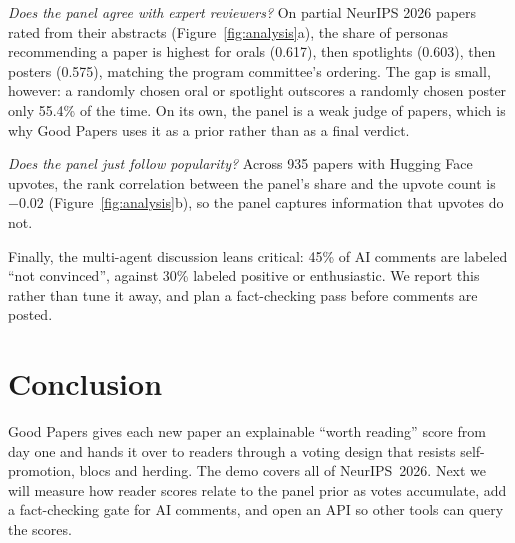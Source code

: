 \documentclass[sigconf]{acmart}
\newcommand{\sys}{Good Papers}
\begin{document}
\emph{Does the panel agree with expert reviewers?}
On partial NeurIPS 2026 papers rated from their abstracts (Figure~\ref{fig:analysis}a), the share of personas recommending a paper is highest for orals (0.617), then spotlights (0.603), then posters (0.575), matching the program committee's ordering.
The gap is small, however: a randomly chosen oral or spotlight outscores a randomly chosen poster only 55.4\% of the time.
On its own, the panel is a weak judge of papers, which is why \sys{} uses it as a prior rather than as a final verdict.

\emph{Does the panel just follow popularity?}
Across 935 papers with Hugging Face upvotes, the rank correlation between the panel's share and the upvote count is $-0.02$ (Figure~\ref{fig:analysis}b), so the panel captures information that upvotes do not.

Finally, the multi-agent discussion leans critical: 45\% of AI comments are labeled ``not convinced'', against 30\% labeled positive or enthusiastic.
We report this rather than tune it away, and plan a fact-checking pass before comments are posted.


\section{Conclusion}
\sys{} gives each new paper an explainable ``worth reading'' score from day one and hands it over to readers through a voting design that resists self-promotion, blocs and herding.
The demo covers all of NeurIPS~2026.
Next we will measure how reader scores relate to the panel prior as votes accumulate, add a fact-checking gate for AI comments, and open an API so other tools can query the scores.



\end{document}
